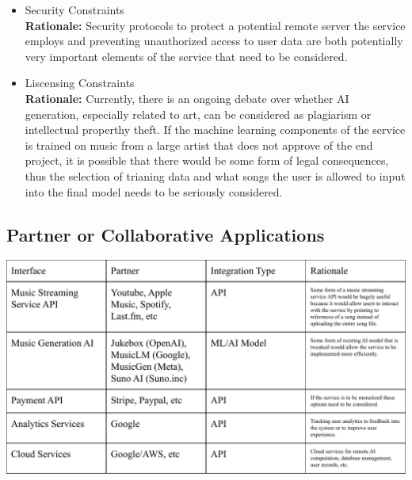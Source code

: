 \documentclass[12pt]{article}
\begin{document}
\begin{itemize}
  \item Security Constraints
  \\ \textbf{Rationale:} Security protocols to protect a potential remote server the service employs and preventing unauthorized access to 
  user data are both potentially very important elements of the service that need to be considered. 

  \item Liscensing Constraints 
  \\ \textbf{Rationale:} Currently, there is an ongoing debate over whether AI generation, especially related to art, can be considered 
  as plagiarism or intellectual properthy theft. If the machine learning components of the service is trained on music from a large artist 
  that does not approve of the end project, it is possible that there would be some form of legal consequences, thus the selection of 
  trianing data and what songs the user is allowed to input into the final model needs to be seriously considered. 

\end{itemize}

\subsection{Partner or Collaborative Applications}

\includegraphics[scale=0.72]{3_3_partner_constraints_figure}
\end{document}
